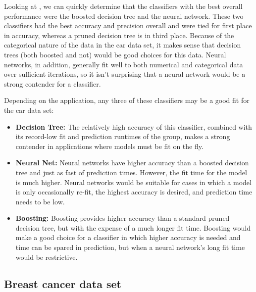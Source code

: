 \documentclass{article}
\begin{document}
    Looking at , we can quickly determine that the classifiers with the best overall performance were the boosted decision tree and the neural network. These two classifiers had the best accuracy and precision overall and were tied for first place in accuracy, whereas a pruned decision tree is in third place. Because of the categorical nature of the data in the car data set, it makes sense that decision trees (both boosted and not) would be good choices for this data. Neural networks, in addition, generally fit well to both numerical and categorical data over sufficient iterations, so it isn't surprising that a neural network would be a strong contender for a classifier.

    Depending on the application, any three of these classifiers may be a good fit for the car data set:

    \begin{itemize}
        \item \textbf{Decision Tree:} The relatively high accuracy of this classifier, combined with its record-low fit and prediction runtimes of the group, makes a strong contender in applications where models must be fit on the fly.
        \item \textbf{Neural Net:} Neural networks have higher accuracy than a boosted decision tree and just as fast of prediction times. However, the fit time for the model is much higher. Neural networks would be suitable for cases in which a model is only occasionally re-fit, the highest accuracy is desired, and prediction time needs to be low.
        \item \textbf{Boosting:} Boosting provides higher accuracy than a standard pruned decision tree, but with the expense of a much longer fit time. Boosting would make a good choice for a classifier in which higher accuracy is needed and time can be spared in prediction, but when a neural network's long fit time would be restrictive.
    \end{itemize}

    \subsection{Breast cancer data set}
\end{document}

